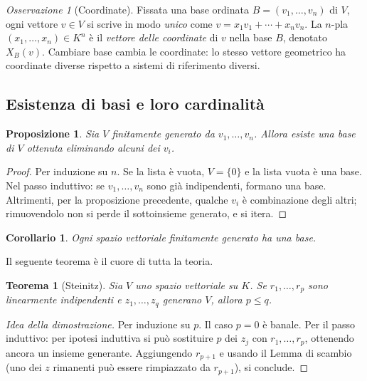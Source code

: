 \documentclass[11pt, a4paper]{book}
\theoremstyle{definition}
\theoremstyle{plain}
\newtheorem{teorema}[definizione]{Teorema}
\newtheorem{proposizione}[definizione]{Proposizione}
\newtheorem{corollario}[definizione]{Corollario}
\theoremstyle{remark}
\newtheorem{osservazione}[definizione]{Osservazione}
\begin{document}
\begin{osservazione}[Coordinate]
Fissata una base ordinata $B = (v_1, \ldots, v_n)$ di $V$, ogni vettore $v \in V$ si scrive in modo \emph{unico} come $v = x_1 v_1 + \cdots + x_n v_n$. La $n$-pla $(x_1, \ldots, x_n) \in K^n$ è il \emph{vettore delle coordinate} di $v$ nella base $B$, denotato $X_B(v)$. Cambiare base cambia le coordinate: lo stesso vettore geometrico ha coordinate diverse rispetto a sistemi di riferimento diversi.
\end{osservazione}

\subsection{Esistenza di basi e loro cardinalità}

\begin{proposizione}
Sia $V$ finitamente generato da $v_1, \ldots, v_n$. Allora esiste una base di $V$ ottenuta eliminando alcuni dei $v_i$.
\end{proposizione}

\begin{proof}
Per induzione su $n$. Se la lista è vuota, $V = \{0\}$ e la lista vuota è una base. Nel passo induttivo: se $v_1, \ldots, v_n$ sono già indipendenti, formano una base. Altrimenti, per la proposizione precedente, qualche $v_i$ è combinazione degli altri; rimuovendolo non si perde il sottoinsieme generato, e si itera.
\end{proof}

\begin{corollario}
Ogni spazio vettoriale finitamente generato ha una base.
\end{corollario}

Il seguente teorema è il cuore di tutta la teoria.

\begin{teorema}[Steinitz]
Sia $V$ uno spazio vettoriale su $K$. Se $r_1, \ldots, r_p$ sono linearmente indipendenti e $z_1, \ldots, z_q$ generano $V$, allora $p \leq q$.
\end{teorema}

\begin{proof}[Idea della dimostrazione]
Per induzione su $p$. Il caso $p=0$ è banale. Per il passo induttivo: per ipotesi induttiva si può sostituire $p$ dei $z_j$ con $r_1, \ldots, r_p$, ottenendo ancora un insieme generante. Aggiungendo $r_{p+1}$ e usando il Lemma di scambio (uno dei $z$ rimanenti può essere rimpiazzato da $r_{p+1}$), si conclude.
\end{proof}
\end{document}
